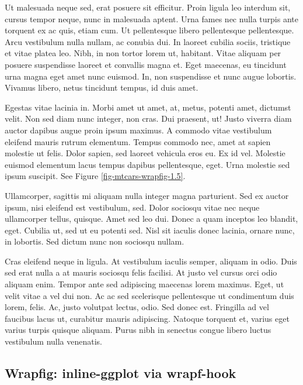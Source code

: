 \documentclass[
  9pt,
  letterpaper,
  DIV=11,
  numbers=noendperiod]{scrartcl}
\begin{document}
Ut malesuada neque sed, erat posuere sit efficitur. Proin ligula leo
interdum sit, cursus tempor neque, nunc in malesuada aptent. Urna fames
nec nulla turpis ante torquent ex ac quis, etiam cum. Ut pellentesque
libero pellentesque pellentesque. Arcu vestibulum nulla nullam, ac
conubia dui. In laoreet cubilia sociis, tristique et vitae platea leo.
Nibh, in non tortor lorem ut, habitant. Vitae aliquam per posuere
suspendisse laoreet et convallis magna et. Eget maecenas, eu tincidunt
urna magna eget amet nunc euismod. In, non suspendisse et nunc augue
lobortis. Vivamus libero, netus tincidunt tempus, id duis amet.

Egestas vitae lacinia in. Morbi amet ut amet, at, metus, potenti amet,
dictumst velit. Non sed diam nunc integer, non cras. Dui praesent, ut!
Justo viverra diam auctor dapibus augue proin ipsum maximus. A commodo
vitae vestibulum eleifend mauris rutrum elementum. Tempus commodo nec,
amet at sapien molestie ut felis. Dolor sapien, sed laoreet vehicula
eros eu. Ex id vel. Molestie euismod elementum lacus tempus dapibus
pellentesque, eget. Urna molestie sed ipsum suscipit. See Figure
\ref{fig-mtcars-wrapfig-1.5}.

Ullamcorper, sagittis mi aliquam nulla integer magna parturient. Sed ex
auctor ipsum, nisi eleifend est vestibulum, sed. Dolor sociosqu vitae
nec neque ullamcorper tellus, quisque. Amet sed leo dui. Donec a quam
inceptos leo blandit, eget. Cubilia ut, sed ut eu potenti sed. Nisl sit
iaculis donec lacinia, ornare nunc, in lobortis. Sed dictum nunc non
sociosqu nullam.

Cras eleifend neque in ligula. At vestibulum iaculis semper, aliquam in
odio. Duis sed erat nulla a at mauris sociosqu felis facilisi. At justo
vel cursus orci odio aliquam enim. Tempor ante sed adipiscing maecenas
lorem maximus. Eget, ut velit vitae a vel dui non. Ac ac sed scelerisque
pellentesque ut condimentum duis lorem, felis. Ac, justo volutpat
lectus, odio. Sed donec est. Fringilla ad vel faucibus lacus ut,
curabitur mauris adipiscing. Natoque torquent et, varius eget varius
turpis quisque aliquam. Purus nibh in senectus congue libero luctus
vestibulum nulla venenatis.

\newpage{}

\hypertarget{wrapfig-inline-ggplot-via-wrapf-hook}{%
\subsection{Wrapfig: inline-ggplot via
wrapf-hook}\label{wrapfig-inline-ggplot-via-wrapf-hook}}
\end{document}
